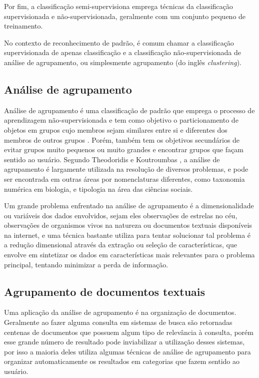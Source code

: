 \documentclass[a4paper,12pt]{article}
\begin{document}
Por fim, a classificação semi-supervisiona emprega técnicas da classificação supervisionada e não-supervisionada, geralmente com um conjunto pequeno de treinamento.

No contexto de reconhecimento de padrão, é comum chamar a classificação supervisionada de apenas classificação e a classificação não-supervisionada de análise de agrupamento, ou simplesmente agrupamento (do inglês \textit{clustering}). 



\subsection{Análise de agrupamento}
\label{sec:analise_agrupamento}

Análise de agrupamento é uma classificação de padrão que emprega o processo de aprendizagem não-supervisionada e tem como objetivo o particionamento de objetos em grupos cujo membros sejam similares entre si e diferentes dos membros de outros grupos \cite{Jain99}. Porém, também tem os objetivos secundários de evitar grupos muito pequenos ou muito grandes e encontrar grupos que façam sentido ao usuário. Segundo Theodoridis e Koutroumbas \cite{Koutroumbas06}, a análise de agrupamento é largamente utilizada na resolução de diversos problemas, e pode ser encontrada em outras áreas por nomenclaturas diferentes, como taxonomia numérica em biologia, e tipologia na área das ciências sociais.

Um grande problema enfrentado na análise de agrupamento é a dimensionalidade ou variáveis dos dados envolvidos, sejam eles observações de estrelas no céu, observações de organismos vivos na natureza ou documentos textuais disponíveis na internet, e uma técnica bastante utiliza para tentar solucionar tal problema é a redução dimensional através da extração ou seleção de características, que envolve em sintetizar os dados em características mais relevantes para o problema principal, tentando minimizar a perda de informação.

\subsection{Agrupamento de documentos textuais}
\label{sec:agrupamento_doc_textual}

Uma aplicação da análise de agrupamento é na organização de documentos. Geralmente ao fazer alguma consulta em sistemas de busca são retornadas centenas de documentos que possuem algum tipo de relevância à consulta, porém esse grande número de resultado pode inviabilizar a utilização desses sistemas, por isso a maioria deles utiliza algumas técnicas de análise de agrupamento para organizar automaticamente os resultados em categorias que fazem sentido ao usuário. 
\end{document}
